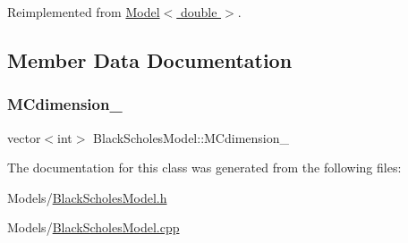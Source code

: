 Reimplemented from \hyperlink{class_model_a19ba3a18a45aad9012dbc6cbafb09e39}{Model$<$ double $>$}.



\subsection{Member Data Documentation}
\hypertarget{class_black_scholes_model_a9457c1edc58d9f737f7eeeaaa6812488}{}\label{class_black_scholes_model_a9457c1edc58d9f737f7eeeaaa6812488} 
\subsubsection{\texorpdfstring{M\+Cdimension\+\_\+}{MCdimension\_}}
{\footnotesize\ttfamily vector$<$int$>$ Black\+Scholes\+Model\+::\+M\+Cdimension\+\_\+\hspace{0.3cm}{\ttfamily [private]}}



The documentation for this class was generated from the following files\+:\begin{DoxyCompactItemize}
\item 
Models/\hyperlink{_black_scholes_model_8h}{Black\+Scholes\+Model.\+h}\item 
Models/\hyperlink{_black_scholes_model_8cpp}{Black\+Scholes\+Model.\+cpp}\end{DoxyCompactItemize}

